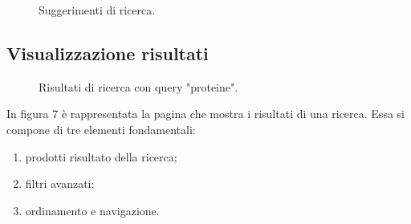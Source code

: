 \begin{figure}[!htb]
	\caption{\label{fig:figura6}} Suggerimenti di ricerca.
\end{figure}

\subsection{Visualizzazione risultati}
\begin{figure}[!htb]
	\caption{\label{fig:figura7}} Risultati di ricerca con query "proteine".
\end{figure}
In figura 7 è rappresentata la pagina che mostra i risultati di una ricerca. Essa si compone di tre elementi fondamentali:
\begin{enumerate}
    \item prodotti risultato della ricerca;
    \item filtri avanzati;
    \item ordinamento e navigazione.
\end{enumerate}
